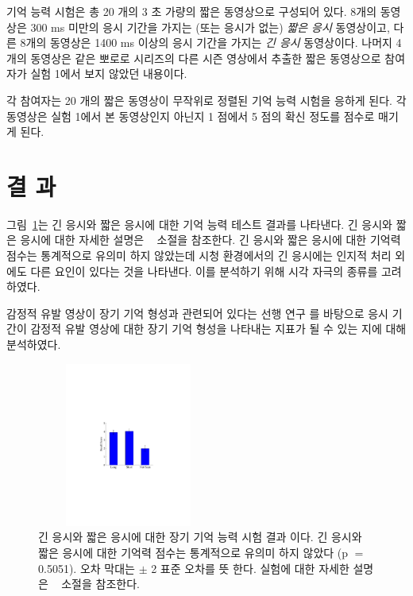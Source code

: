 \documentclass{kcc}
\begin{document}
기억 능력 시험은 총 20 개의 3 초 가량의 짧은 동영상으로 구성되어 있다. 8개의 동영상은 300 ms 미만의 응시 기간을 가지는 (또는 응시가 없는) \textit{짧은 응시} 동영상이고, 다른 8개의 동영상은 1400 ms 이상의 응시 기간을 가지는 \textit{긴 응시} 동영상이다. 나머지 4개의 동영상은 같은 뽀로로 시리즈의 다른 시즌 영상에서 추출한 짧은 동영상으로 참여자가 실험 1에서 보지 않았던 내용이다.

각 참여자는 20 개의 짧은 동영상이 무작위로 정렬된 기억 능력 시험을 응하게 된다. 각 동영상은 실험 1에서 본 동영상인지 아닌지 1 점에서 5 점의 확신 정도를 점수로 매기게 된다. 

\section{결 과}
그림~\ref{fig:memtest-leng}는 긴 응시와 짧은 응시에 대한 기억 능력 테스트 결과를 나타낸다. 긴 응시와 짧은 응시에 대한 자세한 설명은 ~ 소절을 참조한다. 긴 응시와 짧은 응시에 대한 기억력 점수는 통계적으로 유의미 하지 않았는데 시청 환경에서의 긴 응시에는 인지적 처리 외에도 다른 요인이 있다는 것을 나타낸다. 이를 분석하기 위해 시각 자극의 종류를 고려하였다.

감정적 유발 영상이 장기 기억 형성과 관련되어 있다는 선행 연구 \cite{Cahill1996amyg,Cahill1998baso}를 바탕으로 응시 기간이 감정적 유발 영상에 대한 장기 기억 형성을 나타내는 지표가 될 수 있는 지에 대해 분석하였다. 

\begin{figure}
  \centerline{\includegraphics[width=60mm,height=54mm,trim=65mm 103mm 68mm 100mm]{./eps/memtest_leng}}
  \caption{긴 응시와 짧은 응시에 대한 장기 기억 능력 시험 결과 이다. 긴 응시와 짧은 응시에 대한 기억력 점수는 통계적으로 유의미 하지 않았다 (p $=$ 0.5051). 오차 막대는 $\pm$ 2 표준 오차를 뜻 한다. 실험에 대한 자세한 설명은 ~ 소절을 참조한다.}
  \label{fig:memtest-leng}
\end{figure}
\end{document}
